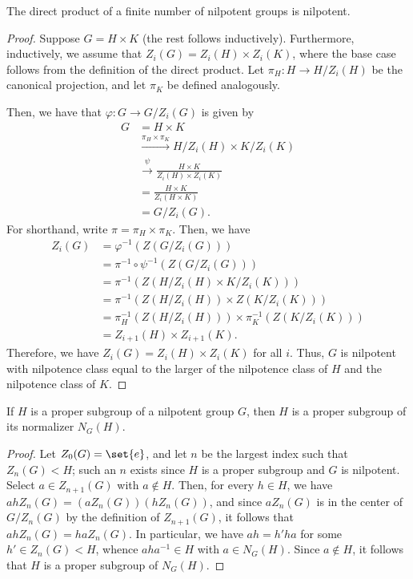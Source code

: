 \documentclass[10pt]{mypackage}
\begin{document}
\begin{proposition}
  The direct product of a finite number of nilpotent groups is nilpotent.
\end{proposition}
\begin{proof}
  Suppose $G = H\times K$ (the rest follows inductively). Furthermore, inductively, we assume that $Z_i\left( G \right) = Z_i\left( H \right) \times Z_i\left( K \right)$, where the base case follows from the definition of the direct product. Let $\pi_H\colon H\rightarrow H/Z_i(H)$ be the canonical projection, and let $\pi_K$ be defined analogously.

  Then, we have that $\varphi\colon G\rightarrow G/Z_i(G)$ is given by
  \begin{align*}
    G &= H\times K\\
      &\xrightarrow{\pi_H\times \pi_K} H/Z_i(H)\times K/Z_i(K)\\
      &\xrightarrow{\psi} \frac{H\times K}{Z_i\left( H \right)\times Z_i\left( K \right)}\\
      &= \frac{H\times K}{Z_i\left( H\times K \right)}\\
      &= G/Z_i(G).
  \end{align*}
  For shorthand, write $\pi = \pi_H\times \pi_K$. Then, we have
  \begin{align*}
    Z_i(G) &= \varphi^{-1}\left( Z\left( G/Z_i(G) \right) \right)\\
           &= \pi^{-1}\circ\psi^{-1} \left( Z\left( G/Z_i(G) \right) \right)\\
           &= \pi^{-1} \left( Z\left( H/Z_i(H)\times K/Z_i(K) \right) \right)\\
           &= \pi^{-1} \left( Z\left( H/Z_i(H) \right) \times Z\left( K/Z_i(K) \right) \right)\\
           &= \pi_H^{-1}\left( Z\left( H/Z_i(H) \right) \right)\times \pi_K^{-1} \left( Z\left( K/Z_i(K) \right) \right)\\
           &= Z_{i+1}(H)\times Z_{i+1}(K).
  \end{align*}
  Therefore, we have $Z_i(G) = Z_i(H) \times Z_i(K)$ for all $i$. Thus, $G$ is nilpotent with nilpotence class equal to the larger of the nilpotence class of $H$ and the nilpotence class of $K$.
\end{proof}
\begin{proposition}
  If $H$ is a proper subgroup of a nilpotent group $G$, then $H$ is a proper subgroup of its normalizer $N_G(H)$.
\end{proposition}
\begin{proof}
  Let $Z_0(G) = \set{e}$, and let $n$ be the largest index such that $Z_n(G) < H$; such an $n$ exists since $H$ is a proper subgroup and $G$ is nilpotent. Select $a\in Z_{n+1}(G)$ with $a\notin H$. Then, for every $h\in H$, we have $ahZ_n(G) = \left( aZ_n(G) \right)\left( hZ_n(G) \right)$, and since $aZ_n(G)$ is in the center of $G/Z_n(G)$ by the definition of $Z_{n+1}(G)$, it follows that $ahZ_n(G) = haZ_n(G)$. In particular, we have $ah = h'ha$ for some $h'\in Z_n(G) < H$, whence $aha^{-1}\in H$ with $a\in N_G(H)$. Since $a\notin H$, it follows that $H$ is a proper subgroup of $N_G(H)$.
\end{proof}
\end{document}
